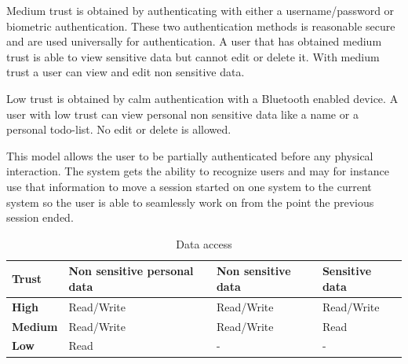 Medium trust is obtained by authenticating with either a username/password or biometric authentication.
These two authentication methods is reasonable secure and are used universally for authentication.
A user that has obtained medium trust is able to view sensitive data but cannot edit or delete it.
With medium trust a user can view and edit non sensitive data.

Low trust is obtained by calm authentication with a Bluetooth enabled device.
A user with low trust can view personal non sensitive data like a name or a personal todo-list.
No edit or delete is allowed.

This model allows the user to be partially authenticated before any physical interaction.
The system gets the ability to recognize users and may for instance use that information to move a session started on one system to the current system so the user is able to seamlessly work on from the point the previous session ended.

\begin{table}[!t]
\caption{Data access}
\label{table_data_access}
\centering
\begin{tabular}{|p{1.3cm}|p{2.0cm}|p{2.0cm}|p{2.0cm}|}
\hline
\textbf{Trust} & \textbf{Non sensitive personal data} & \textbf{Non sensitive data} & \textbf{Sensitive data}\\
\hline
\textbf{High} & Read/Write & Read/Write & Read/Write\\
\hline
\textbf{Medium} & Read/Write & Read/Write & Read\\
\hline
\textbf{Low} & Read & - & -\\
\hline
\end{tabular}
\end{table}